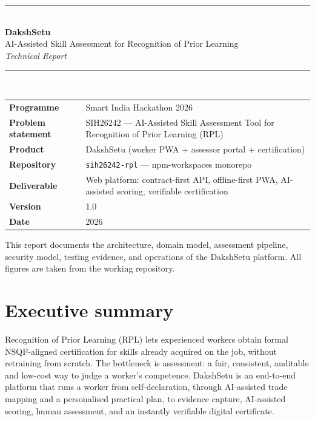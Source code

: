 \documentclass[11pt,a4paper]{article}
\newcommand{\code}[1]{\texttt{\small #1}}
\begin{document}
\begin{titlepage}
\centering
\vspace*{2.2cm}
{\color{navy}\rule{\textwidth}{1.4pt}}\\[0.6em]
{\Huge\bfseries\color{navy} DakshSetu}\\[0.35em]
{\large AI-Assisted Skill Assessment for Recognition of Prior Learning}\\[0.35em]
{\large\itshape Technical Report}\\[0.7em]
{\color{navy}\rule{\textwidth}{1.4pt}}\\[2.2em]

\begin{tabular}{L{4.2cm}L{9.5cm}}
\textbf{Programme} & Smart India Hackathon 2026 \\[2pt]
\textbf{Problem statement} & SIH26242 --- AI-Assisted Skill Assessment Tool for Recognition of Prior Learning (RPL) \\[2pt]
\textbf{Product} & DakshSetu (worker PWA + assessor portal + certification) \\[2pt]
\textbf{Repository} & \code{sih26242-rpl} --- npm-workspaces monorepo \\[2pt]
\textbf{Deliverable} & Web platform: contract-first API, offline-first PWA, AI-assisted scoring, verifiable certification \\[2pt]
\textbf{Version} & 1.0 \\[2pt]
\textbf{Date} & 2026 \\
\end{tabular}

\vfill
{\small This report documents the architecture, domain model, assessment
pipeline, security model, testing evidence, and operations of the
DakshSetu platform. All figures are taken from the working repository.}
\vspace{1.2cm}
\end{titlepage}

\section*{Executive summary}
Recognition of Prior Learning (RPL) lets experienced workers obtain formal
NSQF-aligned certification for skills already acquired on the job, without
retraining from scratch. The bottleneck is assessment: a fair, consistent,
auditable and low-cost way to judge a worker's competence. DakshSetu is an
end-to-end platform that runs a worker from self-declaration, through
AI-assisted trade mapping and a personalised practical plan, to evidence
capture, AI-assisted scoring, human assessment, and an instantly verifiable
digital certificate.
\end{document}
